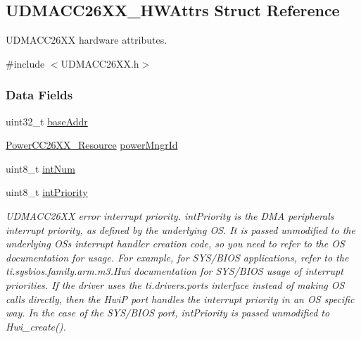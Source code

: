 \subsection{U\+D\+M\+A\+C\+C26\+X\+X\+\_\+\+H\+W\+Attrs Struct Reference}
\label{struct_u_d_m_a_c_c26_x_x___h_w_attrs}


U\+D\+M\+A\+C\+C26\+X\+X hardware attributes.  




{\ttfamily \#include $<$U\+D\+M\+A\+C\+C26\+X\+X.\+h$>$}

\subsubsection*{Data Fields}
\begin{DoxyCompactItemize}
\item 
uint32\+\_\+t \hyperlink{struct_u_d_m_a_c_c26_x_x___h_w_attrs_a62ff254a8b85ecced4f749c35065515d}{base\+Addr}
\item 
\hyperlink{_power_c_c26_x_x_8h_a2e11676879f87f39c099719d717dd04e}{Power\+C\+C26\+X\+X\+\_\+\+Resource} \hyperlink{struct_u_d_m_a_c_c26_x_x___h_w_attrs_a77e02a4666668a7d35d012e5dd7b2d24}{power\+Mngr\+Id}
\item 
uint8\+\_\+t \hyperlink{struct_u_d_m_a_c_c26_x_x___h_w_attrs_a842b5f7c2c0a2563eaf6f037cff07785}{int\+Num}
\item 
uint8\+\_\+t \hyperlink{struct_u_d_m_a_c_c26_x_x___h_w_attrs_a56b5f00f14e051a08329130b6d2c6fe6}{int\+Priority}
\begin{DoxyCompactList}\small\item\em U\+D\+M\+A\+C\+C26\+X\+X error interrupt priority. int\+Priority is the D\+M\+A peripheral\textquotesingle{}s interrupt priority, as defined by the underlying O\+S. It is passed unmodified to the underlying O\+S\textquotesingle{}s interrupt handler creation code, so you need to refer to the O\+S documentation for usage. For example, for S\+Y\+S/\+B\+I\+O\+S applications, refer to the ti.\+sysbios.\+family.\+arm.\+m3.\+Hwi documentation for S\+Y\+S/\+B\+I\+O\+S usage of interrupt priorities. If the driver uses the ti.\+drivers.\+ports interface instead of making O\+S calls directly, then the Hwi\+P port handles the interrupt priority in an O\+S specific way. In the case of the S\+Y\+S/\+B\+I\+O\+S port, int\+Priority is passed unmodified to Hwi\+\_\+create(). \end{DoxyCompactList}\end{DoxyCompactItemize}



